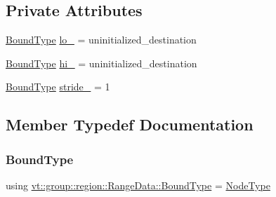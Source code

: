 \subsection*{Private Attributes}
\begin{DoxyCompactItemize}
\item 
\hyperlink{structvt_1_1group_1_1region_1_1_range_data_a12ca75365c79bece7d169149b354011d}{Bound\+Type} \hyperlink{structvt_1_1group_1_1region_1_1_range_data_a5f04348937d15fa215735e608159c2a4}{lo\+\_\+} = uninitialized\+\_\+destination
\item 
\hyperlink{structvt_1_1group_1_1region_1_1_range_data_a12ca75365c79bece7d169149b354011d}{Bound\+Type} \hyperlink{structvt_1_1group_1_1region_1_1_range_data_a9f3dad7035bf7cb591885af57528d210}{hi\+\_\+} = uninitialized\+\_\+destination
\item 
\hyperlink{structvt_1_1group_1_1region_1_1_range_data_a12ca75365c79bece7d169149b354011d}{Bound\+Type} \hyperlink{structvt_1_1group_1_1region_1_1_range_data_a8f40ed5e914ee5f68c7f274df5cba1dd}{stride\+\_\+} = 1
\end{DoxyCompactItemize}


\subsection{Member Typedef Documentation}
\mbox{\label{structvt_1_1group_1_1region_1_1_range_data_a12ca75365c79bece7d169149b354011d}} 
\subsubsection{\texorpdfstring{Bound\+Type}{BoundType}}
{\footnotesize\ttfamily using \hyperlink{structvt_1_1group_1_1region_1_1_range_data_a12ca75365c79bece7d169149b354011d}{vt\+::group\+::region\+::\+Range\+Data\+::\+Bound\+Type} =  \hyperlink{namespacevt_a866da9d0efc19c0a1ce79e9e492f47e2}{Node\+Type}}

\mbox{\label{structvt_1_1group_1_1region_1_1_range_data_a2450bd305df0f74edca0a864a3d21017}} 

